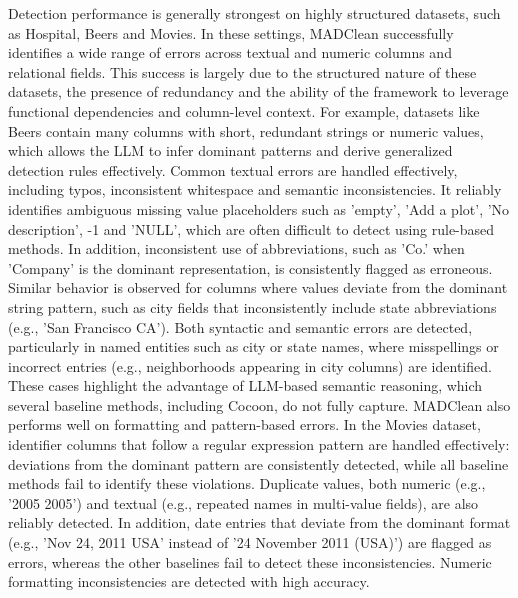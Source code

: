 Detection performance is generally strongest on highly structured datasets, such as Hospital, Beers and Movies. 
In these settings, MADClean successfully identifies a wide range of errors across textual and numeric columns and relational fields. 
This success is largely due to the structured nature of these datasets, the presence of redundancy and the ability of the framework to leverage functional dependencies and column-level context. 
For example, datasets like Beers contain many columns with short, redundant strings or numeric values, which allows the LLM to infer dominant patterns and derive generalized detection rules effectively.
\newline\newline
Common textual errors are handled effectively, including typos, inconsistent whitespace and semantic inconsistencies. 
It reliably identifies ambiguous missing value placeholders such as 'empty', 'Add a plot', 'No description', -1 and 'NULL', which are often difficult to detect using rule-based methods.  
In addition, inconsistent use of abbreviations, such as 'Co.' when 'Company' is the dominant representation, is consistently flagged as erroneous. 
Similar behavior is observed for columns where values deviate from the dominant string pattern, such as city fields that inconsistently include state abbreviations (e.g., 'San Francisco CA'). 
Both syntactic and semantic errors are detected, particularly in named entities such as city or state names, where misspellings or incorrect entries (e.g., neighborhoods appearing in city columns) are identified. 
These cases highlight the advantage of LLM-based semantic reasoning, which several baseline methods, including Cocoon, do not fully capture.
\newline\newline
MADClean also performs well on formatting and pattern-based errors. 
In the Movies dataset, identifier columns that follow a regular expression pattern are handled effectively: deviations from the dominant pattern are consistently detected, while all baseline methods fail to identify these violations. 
Duplicate values, both numeric (e.g., '2005 2005') and textual (e.g., repeated names in multi-value fields), are also reliably detected. 
In addition, date entries that deviate from the dominant format (e.g.,  'Nov 24, 2011 USA' instead of '24 November 2011 (USA)') are flagged as errors, whereas the other baselines fail to detect these inconsistencies.
\newline\newline
Numeric formatting inconsistencies are detected with high accuracy. 
